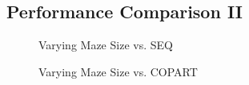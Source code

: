 \fi

\subsection{Performance Comparison II}
\label{sec:SMPdesign:Performance Comparison II}

\begin{figure}[tb]
\centering
{}
\caption{Varying Maze Size vs. SEQ}
\label{fig:SMPdesign:Varying Maze Size vs. SEQ}
\end{figure}

\begin{figure}[tb]
\centering
{}
\caption{Varying Maze Size vs. COPART}
\label{fig:SMPdesign:Varying Maze Size vs. COPART}
\end{figure}

